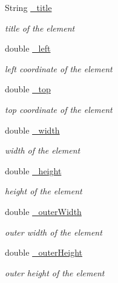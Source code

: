 \begin{DoxyCompactItemize}
String \hyperlink{class_web_analyzer_1_1_models_1_1_data_model_1_1_d_o_m_element_model_a1f78ca7c25fcb00ee45f23482ae92c3a}{\+\_\+title}
\begin{DoxyCompactList}\small\item\em title of the element \end{DoxyCompactList}\item 
double \hyperlink{class_web_analyzer_1_1_models_1_1_data_model_1_1_d_o_m_element_model_aeb026965e7f90ea485c57b8b78d019b0}{\+\_\+left}
\begin{DoxyCompactList}\small\item\em left coordinate of the element \end{DoxyCompactList}\item 
double \hyperlink{class_web_analyzer_1_1_models_1_1_data_model_1_1_d_o_m_element_model_a2375d70647ec50aa1a497e9e9ab6aade}{\+\_\+top}
\begin{DoxyCompactList}\small\item\em top coordinate of the element \end{DoxyCompactList}\item 
double \hyperlink{class_web_analyzer_1_1_models_1_1_data_model_1_1_d_o_m_element_model_ad89c6f97d80115d398e26e76eb2ab7b7}{\+\_\+width}
\begin{DoxyCompactList}\small\item\em width of the element \end{DoxyCompactList}\item 
double \hyperlink{class_web_analyzer_1_1_models_1_1_data_model_1_1_d_o_m_element_model_a271887d24b632402d029618d0a208cfe}{\+\_\+height}
\begin{DoxyCompactList}\small\item\em height of the element \end{DoxyCompactList}\item 
double \hyperlink{class_web_analyzer_1_1_models_1_1_data_model_1_1_d_o_m_element_model_a4812f06ca8225b4386f5e5ea45370550}{\+\_\+outer\+Width}
\begin{DoxyCompactList}\small\item\em outer width of the element \end{DoxyCompactList}\item 
double \hyperlink{class_web_analyzer_1_1_models_1_1_data_model_1_1_d_o_m_element_model_a4d8c5283f4625e042bb2a98cdec323ce}{\+\_\+outer\+Height}
\begin{DoxyCompactList}\small\item\em outer height of the element \end{DoxyCompactList}\item 

\end{DoxyCompactItemize}
